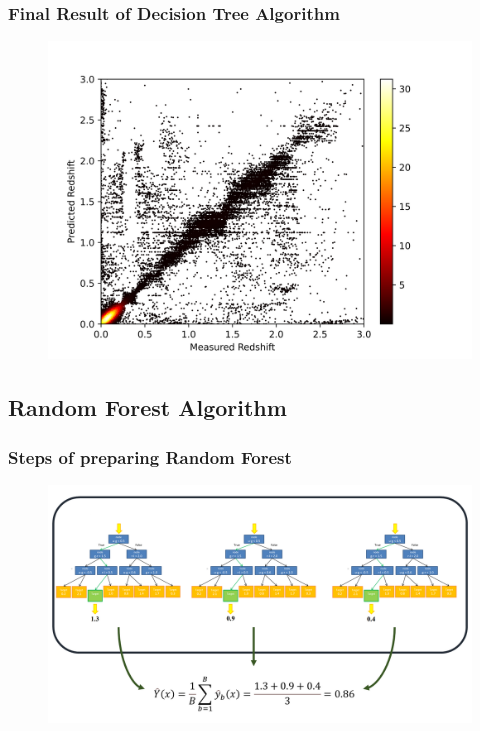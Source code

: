 \documentclass{beamer}
\begin{document}
\begin{frame}
	\frametitle{Final Result of Decision Tree Algorithm}
    \begin{figure}
        \includegraphics[scale=0.6]{img/Tree_Result.png}
    \end{figure}
    \end{frame}
\subsection{Random Forest Algorithm}
\begin{frame}
	\frametitle{Steps of preparing Random Forest}
    \begin{figure}
        \includegraphics[scale=0.36]{img/Random_Forest_schematic.png}
       
    \end{figure}
    \end{frame}
\end{document}
